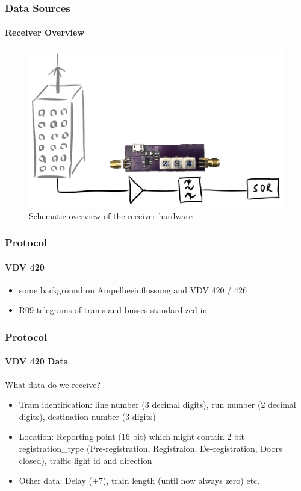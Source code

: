 
\begin{frame}
\frametitle{Data Sources}
\framesubtitle{Receiver Overview}
\begin{figure}
\centering
\includegraphics[height=0.65\textheight]{figs/antenna-filter.pdf}
\caption{Schematic overview of the receiver hardware}
\end{figure}
\end{frame}


\begin{frame}
\frametitle{Protocol}
\framesubtitle{VDV 420}
	\begin{itemize}
		\item some background on Ampelbeeinflussung and VDV 420 / 426
		\item R09 telegrams of trams and busses standardized in 
	\end{itemize}
\end{frame}


\begin{frame}
\frametitle{Protocol}
\framesubtitle{VDV 420 Data}
What data do we receive?
\begin{itemize}
		\item Tram identification: line number (3 decimal digits), run number (2 decimal digits), destination number (3 digits)
		\item Location: Reporting point (16 bit) which might contain 2 bit registration\_type (Pre-registration, Registraion, De-registration, Doors closed), traffic light id and direction
		\item Other data: Delay ($\pm 7$), train length (until now always zero) etc.
\end{itemize}
\end{frame}

